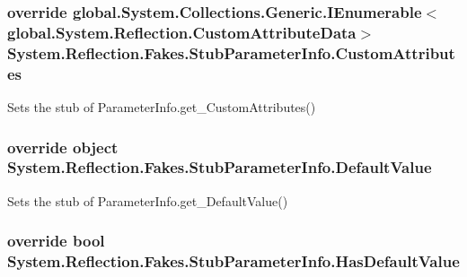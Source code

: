 \hypertarget{class_system_1_1_reflection_1_1_fakes_1_1_stub_parameter_info_a45735506c739801bedc3a6af6f9a322c}{
\subsubsection[{Custom\-Attributes}]{\setlength{\rightskip}{0pt plus 5cm}override global.\-System.\-Collections.\-Generic.\-I\-Enumerable$<$global.\-System.\-Reflection.\-Custom\-Attribute\-Data$>$ System.\-Reflection.\-Fakes.\-Stub\-Parameter\-Info.\-Custom\-Attributes\hspace{0.3cm}{\ttfamily [get]}}}\label{class_system_1_1_reflection_1_1_fakes_1_1_stub_parameter_info_a45735506c739801bedc3a6af6f9a322c}


Sets the stub of Parameter\-Info.\-get\-\_\-\-Custom\-Attributes()

\hypertarget{class_system_1_1_reflection_1_1_fakes_1_1_stub_parameter_info_a5740fa043ff02e9d2d7bf4c4c2de2f77}{
\subsubsection[{Default\-Value}]{\setlength{\rightskip}{0pt plus 5cm}override object System.\-Reflection.\-Fakes.\-Stub\-Parameter\-Info.\-Default\-Value\hspace{0.3cm}{\ttfamily [get]}}}\label{class_system_1_1_reflection_1_1_fakes_1_1_stub_parameter_info_a5740fa043ff02e9d2d7bf4c4c2de2f77}


Sets the stub of Parameter\-Info.\-get\-\_\-\-Default\-Value()

\hypertarget{class_system_1_1_reflection_1_1_fakes_1_1_stub_parameter_info_a603ab476e4fc578ee6b596d1989e4817}{
\subsubsection[{Has\-Default\-Value}]{\setlength{\rightskip}{0pt plus 5cm}override bool System.\-Reflection.\-Fakes.\-Stub\-Parameter\-Info.\-Has\-Default\-Value\hspace{0.3cm}{\ttfamily [get]}}}\label{class_system_1_1_reflection_1_1_fakes_1_1_stub_parameter_info_a603ab476e4fc578ee6b596d1989e4817}


